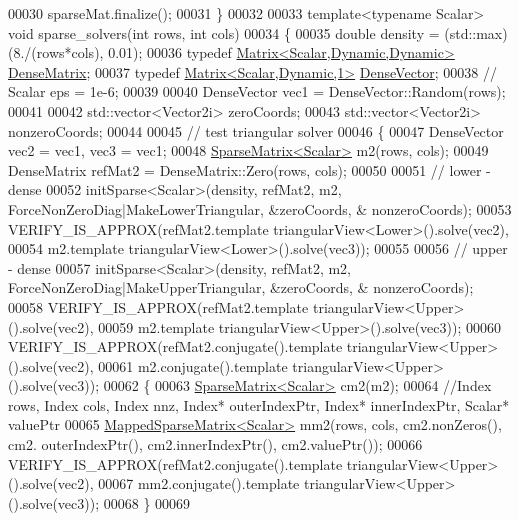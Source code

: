 \begin{DoxyCode}
00030   sparseMat.finalize();
00031 \}
00032 
00033 \textcolor{keyword}{template}<\textcolor{keyword}{typename} Scalar> \textcolor{keywordtype}{void} sparse\_solvers(\textcolor{keywordtype}{int} rows, \textcolor{keywordtype}{int} cols)
00034 \{
00035   \textcolor{keywordtype}{double} density = (std::max)(8./(rows*cols), 0.01);
00036   \textcolor{keyword}{typedef} \hyperlink{group___core___module}{Matrix<Scalar,Dynamic,Dynamic>} 
      \hyperlink{group___core___module}{DenseMatrix};
00037   \textcolor{keyword}{typedef} \hyperlink{group___core___module}{Matrix<Scalar,Dynamic,1>} \hyperlink{group___core___module}{DenseVector};
00038   \textcolor{comment}{// Scalar eps = 1e-6;}
00039 
00040   DenseVector vec1 = DenseVector::Random(rows);
00041 
00042   std::vector<Vector2i> zeroCoords;
00043   std::vector<Vector2i> nonzeroCoords;
00044 
00045   \textcolor{comment}{// test triangular solver}
00046   \{
00047     DenseVector vec2 = vec1, vec3 = vec1;
00048     \hyperlink{group___sparse_core___module}{SparseMatrix<Scalar>} m2(rows, cols);
00049     DenseMatrix refMat2 = DenseMatrix::Zero(rows, cols);
00050 
00051     \textcolor{comment}{// lower - dense}
00052     initSparse<Scalar>(density, refMat2, m2, ForceNonZeroDiag|MakeLowerTriangular, &zeroCoords, &
      nonzeroCoords);
00053     VERIFY\_IS\_APPROX(refMat2.template triangularView<Lower>().solve(vec2),
00054                      m2.template triangularView<Lower>().solve(vec3));
00055 
00056     \textcolor{comment}{// upper - dense}
00057     initSparse<Scalar>(density, refMat2, m2, ForceNonZeroDiag|MakeUpperTriangular, &zeroCoords, &
      nonzeroCoords);
00058     VERIFY\_IS\_APPROX(refMat2.template triangularView<Upper>().solve(vec2),
00059                      m2.template triangularView<Upper>().solve(vec3));
00060     VERIFY\_IS\_APPROX(refMat2.conjugate().template triangularView<Upper>().solve(vec2),
00061                      m2.conjugate().template triangularView<Upper>().solve(vec3));
00062     \{
00063       \hyperlink{group___sparse_core___module}{SparseMatrix<Scalar>} cm2(m2);
00064       \textcolor{comment}{//Index rows, Index cols, Index nnz, Index* outerIndexPtr, Index* innerIndexPtr, Scalar* valuePtr}
00065       \hyperlink{class_eigen_1_1_mapped_sparse_matrix}{MappedSparseMatrix<Scalar>} mm2(rows, cols, cm2.nonZeros(), cm2.
      outerIndexPtr(), cm2.innerIndexPtr(), cm2.valuePtr());
00066       VERIFY\_IS\_APPROX(refMat2.conjugate().template triangularView<Upper>().solve(vec2),
00067                        mm2.conjugate().template triangularView<Upper>().solve(vec3));
00068     \}
00069 

\end{DoxyCode}
